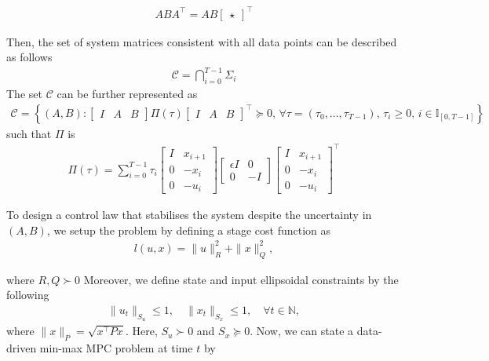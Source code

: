 \begin{align*}
	ABA^\top = AB\begin{bmatrix}	\star \end{bmatrix}^\top
\end{align*}

Then, the set of system matrices consistent with all data points can be described as follows
	\begin{align*}
		\mathcal{C} = \bigcap_{i=0}^{T-1} \Sigma_i
	\end{align*}
\noindent
The set $\mathcal{C}$ can be further represented as
	\begin{align*}
		\mathcal{C} = \left\{ \left( A, B \right) :
		\begin{bmatrix} I & A & B \end{bmatrix}
		\Pi(\tau)
		\begin{bmatrix} I & A & B \end{bmatrix}^\top \succeq 0,\,
		\forall \tau = \left(\tau_0, \ldots, \tau_{T-1}\right),\, \tau_i \geq 0,\, i \in \mathbb{I}_{[0,T-1]}
		\right\}
	\end{align*}
such that $\Pi$ is
\begin{align*}
	\Pi(\tau) = \sum_{i=0}^{T-1} \tau_i
	\begin{bmatrix}
		I & x_{i+1} \\
		0 & -x_i \\
		0 & -u_i
	\end{bmatrix}
	\begin{bmatrix}
		\epsilon I & 0 \\
		0 & -I
	\end{bmatrix}
	\begin{bmatrix}
		I & x_{i+1} \\
		0 & -x_i \\
		0 & -u_i
	\end{bmatrix}^{\top}
\end{align*}


To design a control law that stabilises the system despite the uncertainty in \((A, B)\), we setup the problem by defining a stage cost function as
\begin{align*}
	l(u, x) = \|u\|_R^2 + \|x\|_Q^2,
\end{align*}


where $R, Q \succ 0$
Moreover, we define state and input ellipsoidal constraints by the following
\begin{align*}
\|u_t\|_{S_u} \leq 1, \quad \|x_t\|_{S_x} \leq 1, \quad \forall t \in \mathbb{N},
\end{align*}
where $\|x\|_P = \sqrt{x^\top P x}.$ Here, $S_u \succ 0$ and $S_x \succeq 0.$
Now, we can state a data-driven min-max MPC problem at time $t$ by

